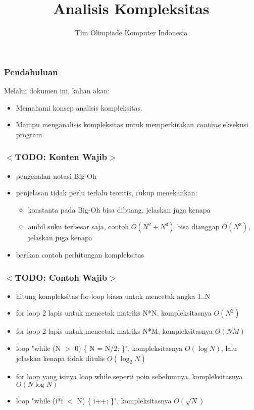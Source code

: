\documentclass{beamer}
\title{Analisis Kompleksitas}
\author{Tim Olimpiade Komputer Indonesia}
\begin{document}
\begin{frame}
\titlepage
\end{frame}

\begin{frame}
\frametitle{Pendahuluan}
Melalui dokumen ini, kalian akan:
\begin{itemize}
	\item Memahami konsep analisis kompleksitas.
	\item Mampu menganalisis kompleksitas untuk memperkirakan \textit{runtime} eksekusi program.
\end{itemize}
\end{frame}

\begin{frame}
\frametitle{$<$TODO: Konten Wajib$>$}
\begin{itemize}
	\item pengenalan notasi Big-Oh
	\item penjelasan tidak perlu terlalu teoritis, cukup menekankan:
	\begin{itemize}
		\item konstanta pada Big-Oh bisa dibuang, jelaskan juga kenapa
		\item ambil suku terbesar saja, contoh $O(N^2 + N^3)$ bisa dianggap $O(N^3)$, jelaskan juga kenapa
	\end{itemize}
	\item berikan contoh perhitungan kompleksitas
\end{itemize}
\end{frame}

\begin{frame}
\frametitle{$<$TODO: Contoh Wajib$>$}
\begin{itemize}
	\item hitung kompleksitas for-loop biasa untuk mencetak angka 1..N
	\item for loop 2 lapis untuk mencetak matriks N*N, kompleksitasnya $O(N^2)$
	\item for loop 2 lapis untuk mencetak matriks N*M, kompleksitasnya $O(NM)$
	\item loop "while (N $>$ 0) \{ N = N/2; \}", kompleksitasnya $O(\log{N})$, lalu jelaskan kenapa tidak ditulis $O(\log_2{N})$
	\item for loop yang isinya loop while seperti poin sebelumnya, kompleksitasnya $O(N\log{N})$
	\item loop "while (i*i $<$ N) \{ i++; \}", kompleksitasnya $O(\sqrt{N})$
\end{itemize}
\end{frame}
\end{document}
